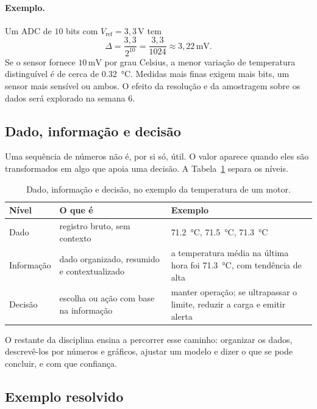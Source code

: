 \paragraph{Exemplo.} Um ADC de $10$ bits com $V_{\mathrm{ref}} = 3{,}3\,\mathrm{V}$ tem
\[
  \Delta = \frac{3{,}3}{2^{10}} = \frac{3{,}3}{1024} \approx 3{,}22\,\mathrm{mV}.
\]
Se o sensor fornece $10\,\mathrm{mV}$ por grau Celsius, a menor variação de temperatura distinguível é de cerca de \qty{0.32}{\degreeCelsius}. Medidas mais finas exigem mais bits, um sensor mais sensível ou ambos. O efeito da resolução e da amostragem sobre os dados será explorado na semana 6.
 
\subsection{Dado, informação e decisão}
\label{sec:dik}
 
Uma sequência de números não é, por si só, útil. O valor aparece quando eles são transformados em algo que apoia uma decisão. A Tabela~\ref{tab:dik} separa os níveis.
 
\begin{table}[htb]
\centering
\caption{Dado, informação e decisão, no exemplo da temperatura de um motor.}
\label{tab:dik}
\begin{tabular}{@{}p{2.2cm}p{4.2cm}p{4.5cm}@{}}
\toprule
\textbf{Nível} & \textbf{O que é} & \textbf{Exemplo} \\
\midrule
Dado        & registro bruto, sem contexto
						& \qty{71.2}{\degreeCelsius}, \qty{71.5}{\degreeCelsius}, \qty{71.3}{\degreeCelsius} \\
Informação  & dado organizado, resumido e contextualizado
						& a temperatura média na última hora foi \qty{71.3}{\degreeCelsius}, com tendência de alta \\
Decisão     & escolha ou ação com base na informação
            & manter operação; se ultrapassar o limite, reduzir a carga e emitir alerta \\
\bottomrule
\end{tabular}
\end{table}
 
O restante da disciplina ensina a percorrer esse caminho: organizar os dados, descrevê-los por números e gráficos, ajustar um modelo e dizer o que se pode concluir, e com que confiança.
 
\subsection{Exemplo resolvido}
\label{sec:resolvido}
 
